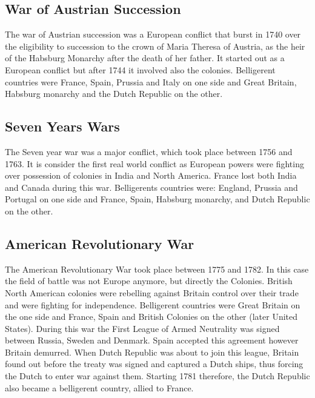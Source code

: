 \documentclass[12pt,a4paper,notitlepage,english]{article}
\begin{document}
\subsection{War of Austrian Succession}
The war of Austrian succession was a European conflict that burst in 1740 over the eligibility to succession to the crown of Maria Theresa of Austria, as the heir of the Habsburg Monarchy after the death of her father. It started out as a European conflict but after 1744 it involved also the colonies. Belligerent countries were France, Spain, Prussia and Italy on one side and Great Britain, Habsburg monarchy and the Dutch Republic on the other. 

\subsection{Seven Years Wars}
The Seven year war was a major conflict, which took place between 1756 and 1763. It is consider the first real world conflict as European powers were fighting over possession of colonies in India and North America. France lost both India and Canada during this war. Belligerents countries were: England, Prussia and Portugal on one side and France, Spain, Habsburg monarchy, and Dutch Republic on the other. 

\subsection{American Revolutionary War}
The American Revolutionary War took place between 1775 and 1782. In this case the field of battle was not Europe anymore, but directly the Colonies. British North American colonies were rebelling against Britain control over their trade and were fighting for independence. Belligerent countries were Great Britain on the one side and France, Spain and British Colonies on the other (later United States). During this war the First League of Armed Neutrality was signed between Russia, Sweden and Denmark. Spain accepted this agreement however Britain demurred. When Dutch Republic was about to join this league, Britain found out before the treaty was signed and captured a Dutch ships, thus forcing the Dutch to enter war against them. Starting 1781 therefore, the Dutch Republic also became a belligerent country, allied to France. 
\end{document}
